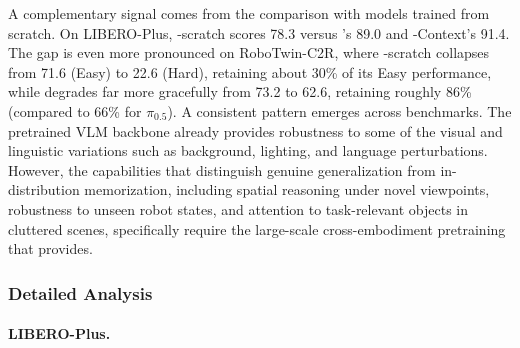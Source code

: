 A complementary signal comes from the comparison with models trained from scratch. On LIBERO-Plus, \ours-scratch scores 78.3 versus \ours's 89.0 and \ours-Context's 91.4. The gap is even more pronounced on RoboTwin-C2R, where \ours-scratch collapses from 71.6 (Easy) to 22.6 (Hard), retaining about 30\% of its Easy performance, while \ours degrades far more gracefully from 73.2 to 62.6, retaining roughly 86\% (compared to 66\% for $\pi_{0.5}$). 
A consistent pattern emerges across benchmarks. The pretrained VLM backbone already provides robustness to some of the visual and linguistic variations such as background, lighting, and language perturbations. However, the capabilities that distinguish genuine generalization from in-distribution memorization, including spatial reasoning under novel viewpoints, robustness to unseen robot states, and attention to task-relevant objects in cluttered scenes, specifically require the large-scale cross-embodiment pretraining that \ours provides.



\subsubsection{Detailed Analysis}

\paragraph{LIBERO-Plus.}

